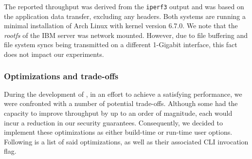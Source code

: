 The reported throughput was derived from the \texttt{iperf3} output and was based on the application data transfer, excluding any headers. Both systems are running a minimal installation of Arch Linux with kernel version 6.7.0. We note that the \textit{rootfs} of the IBM server was network mounted. However, due to file buffering and file system syncs being transmitted on a different 1-Gigabit interface, this fact does not impact our experiments.

\subsubsection{Optimizations and trade-offs}
\label{appfw:daf:optimizations}

During the development of \daf{}, in an effort to achieve a satisfying performance, we were confronted with a number of potential trade-offs. Although some had the capacity to improve throughput by up to an order of magnitude, each would incur a reduction in our security guarantees. Consequently, we decided to implement these optimizations as either build-time or run-time user options. Following is a list of said optimizations, as well as their associated CLI invocation flag.

